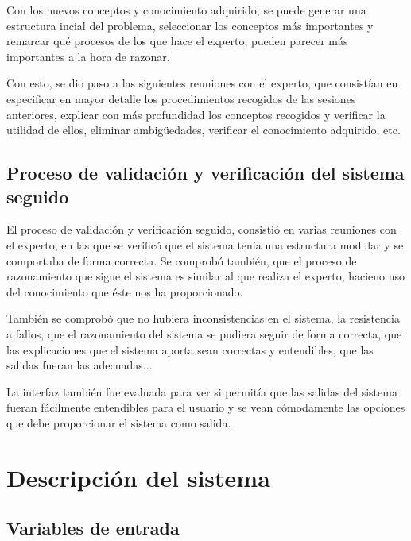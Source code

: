 \documentclass[10pt,spanish]{article}
\theoremstyle{plain}
\theoremstyle{definition}
\begin{document}
Con los nuevos conceptos y conocimiento adquirido, se puede generar una estructura incial del problema, seleccionar los conceptos más importantes y remarcar qué procesos de los que hace el experto, pueden parecer más importantes a la hora de razonar.

Con esto, se dio paso a las siguientes reuniones con el experto, que consistían en especificar en mayor detalle los procedimientos recogidos de las sesiones anteriores, explicar con más profundidad los conceptos recogidos y verificar la utilidad de ellos, eliminar ambigüedades, verificar el conocimiento adquirido, etc.

\subsection{Proceso de validación y verificación del sistema seguido}

El proceso de validación y verificación seguido, consistió en varias reuniones con el experto, en las que se verificó que el sistema tenía una estructura modular y se comportaba de forma correcta. Se comprobó también, que el proceso de razonamiento que sigue el sistema es similar al que realiza el experto, hacieno uso del conocimiento que éste nos ha proporcionado. 

También se comprobó que no hubiera inconsistencias en el sistema, la resistencia a fallos, que el razonamiento del sistema se pudiera seguir de forma correcta, que las explicaciones que el sistema aporta sean correctas y entendibles, que las salidas fueran las adecuadas...

La interfaz también fue evaluada para ver si permitía que las salidas del sistema fueran fácilmente entendibles para el usuario y se vean cómodamente las opciones que debe proporcionar el sistema como salida.

\section{Descripción del sistema}

\subsection{Variables de entrada}
\end{document}

